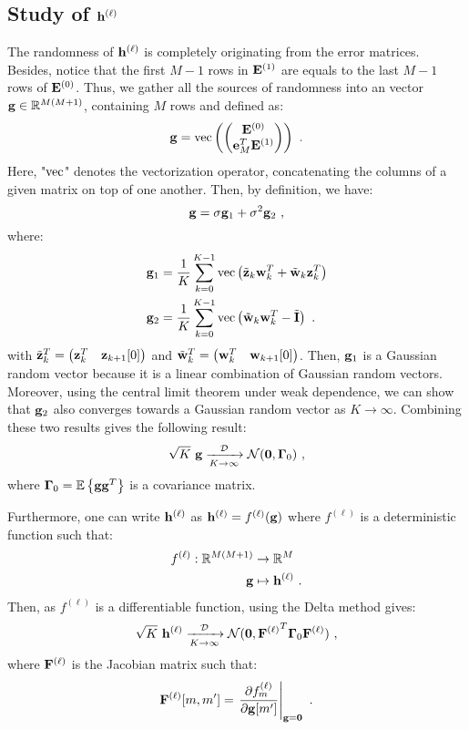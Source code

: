 \documentclass[journal,onecolumn]{IEEEtran}
\begin{document}
\subsection{Study of $\bh^{(\ell)}$}
The randomness of $\bh^{(\ell)}$ is completely originating from the error matrices. Besides, notice that the first $M-1$ rows in $\bE^{(1)}$ are equals to the last $M-1$ rows of $\bE^{(0)}$. Thus, we gather all the sources of randomness into an vector $\bg\in\RR^{M(M+1)}$, containing $M$ rows and defined as:
\[
\bg = \vec\left(
\begin{pmatrix}
\bE^{(0)} \\
\be_M^T\bE^{(1)}
\end{pmatrix}
\right)\ .
\]
Here, "$\vec$" denotes the vectorization operator, concatenating the columns of a given matrix on top of one another. Then, by definition, we have:
\[
\bg = \sigma\bg_1 + \sigma^2\bg_2\ ,
\]
where:
\begin{align*}
\bg_1 &= \dfrac1K\sum_{k=0}^{K-1}\vec\left( \tilde\bz_k\bw_k^T + \tilde\bw_k\bz_k^T \right) \\
\bg_2 &= \dfrac1K\sum_{k=0}^{K-1}\vec\left(\tilde\bw_k\bw_k^T-\tilde\bI \right) \ .
\end{align*}
with $\tilde\bz_k^T= \begin{pmatrix} \bz_k^T & \bz_{k+1}[0] \end{pmatrix}$ and $\tilde\bw_k^T= \begin{pmatrix} \bw_k^T & \bw_{k+1}[0] \end{pmatrix}$. Then, $\bg_1$ is a Gaussian random vector because it is a linear combination of Gaussian random vectors. Moreover, using the central limit theorem under weak dependence, we can show that $\bg_2$ also converges towards a Gaussian random vector as $K\to\infty$. Combining these two results gives the following result:
\[
\sqrt{K}\ \bg \xrightarrow[K\to\infty]{\cD} \cN(\bzero,\bGamma_0)\ ,
\]
where $\bGamma_0=\EE\left\{\bg\bg^T\right\}$ is a covariance matrix.

Furthermore, one can write $\bh^{(\ell)}$ as $\bh^{(\ell)}=f^{(\ell)}(\bg)$ where $f^{(\ell)}$ is a deterministic function such that:
\begin{align*}
f^{(\ell)} : \RR^{M(M+1)} &\to \RR^{M} \\
 \bg &\mapsto \bh^{(\ell)}\ . \\
\end{align*}
Then, as $f^{(\ell)}$ is a differentiable function, using the Delta method gives:
\begin{align*}
\sqrt{K}\ \bh^{(\ell)} \xrightarrow[K\to\infty]{\cD} \cN(\bzero,{\bF^{(\ell)}}^T\bGamma_0\bF^{(\ell)})\ ,
\end{align*}
where $\bF^{(\ell)}$ is the Jacobian matrix such that:
\[
\bF^{(\ell)}[m,m'] = \left.\dfrac{\partial f^{(\ell)}_m}{\partial\bg[m']}\right\vert_{\bg=\bzero}\ .
\]
\end{document}
